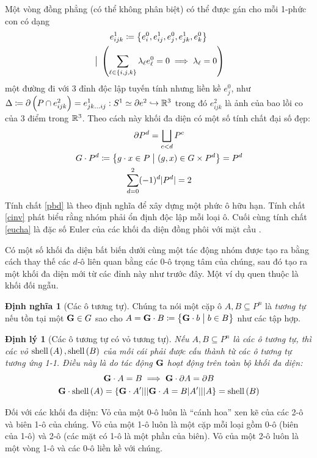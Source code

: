 \documentclass{article}
\theoremstyle{plain}
\newtheorem{theorem}{Định lý}
\theoremstyle{definition}
\newtheorem*{definition}{Định nghĩa}
\begin{document}
Một vòng đồng phẳng (có thể không phân biệt) có thể được gán cho mỗi 1-phức con có dạng
\begin{gather*}
    e^1_{ijk}\coloneqq\left\{e^0_i,e^1_{ij}, e^0_j, e^1_{jk}, e^0_k\right\}\\
    \hspace{1mm}\big|\hspace{1mm} \left(\sum_{\ell\in \left\{i,j,k\right\}}\lambda_\ell e^0_\ell = 0\implies \lambda_\ell = 0\right)
\end{gather*}
một đường đi với 3 đỉnh độc lập tuyến tính nhưng liền kề $e^0_j$, như $\Delta\coloneqq\partial\left(P\cap e^2_{ijk}\right)=e^1_{jk\dots ij}:  S^1\simeq\partial e^2\hookrightarrow \mathbb{R}^3$ trong đó $e^2_{ijk}$ là ảnh của bao lồi co của 3 điểm trong $\mathbb{R}^3$. 
Theo cách này khối đa diện có một số tính chất đại số đẹp: 
\begin{gather}
    \partial P^d = \bigsqcup_{c<d}P^c\label{pbd}\\
    G\cdot P^d\coloneqq\curl{g\cdot x\in P\st (g,x)\in G\times P^d}=P^d\label{cinv}\\
    \sum_{d=0}^2(-1)^d|P^d|=2\label{eucha}
\end{gather}
 Tính chất \ref{pbd} là theo định nghĩa để xây dựng một phức ô hữu hạn.  Tính chất \ref{cinv} phát biểu rằng nhóm phải ổn định độc lập mỗi loại ô. Cuối cùng tính chất \ref{eucha} là đặc số Euler của các khối đa diện đồng phôi với mặt cầu \cite{MR1867354}.

 Có một số khối đa diện bất biến dưới cùng một tác động nhóm được tạo ra bằng cách thay thế các $d$-ô liên quan bằng các 0-ô trọng tâm của chúng, sau đó tạo ra một khối đa diện mới từ các đỉnh này như trước đây. Một ví dụ quen thuộc là khối đối ngẫu. 
 
 \begin{definition}[Các ô tương tự]
    Chúng ta nói một cặp ô $A, B\subseteq P^n$ là \emph{tương tự} nếu tồn tại một $\mathbf{G}\in G$ sao cho $A=\mathbf{G}\cdot B\coloneqq\left\{\mathbf{G}\cdot b\hspace{1mm}\big|\hspace{1mm} b\in B\right\}$ như các tập hợp. 
 \end{definition}
 \begin{theorem}[Các ô tương tự có vỏ tương tự]
     Nếu $A, B\subseteq P^n$ là các ô tương tự, thì các vỏ $\mathrm{shell}\left(A\right), \mathrm{shell}\left(B\right)$ của mỗi cái phải được cấu thành từ các ô tương tự tương ứng 1-1.  Điều này là do tác động $\mathbf{G}$ hoạt động trên toàn bộ khối đa diện: 
     \begin{gather}
         \mathbf{G}\cdot A= B\implies \mathbf{G}\cdot \partial A = \partial B\\
         \mathbf{G}\cdot \mathrm{shell}\left(A\right) = \{\mathbf{G}\cdot A'|||\mathbf{G}\cdot A = B|A'|||A\} = \mathrm{shell}\left(B\right)
     \end{gather}
    
 \end{theorem}
 Đối với các khối đa diện: 
 Vỏ của một 0-ô luôn là ``cánh hoa'' xen kẽ của các 2-ô và biên 1-ô của chúng.  Vỏ của một 1-ô luôn là một cặp mỗi loại gồm 0-ô (biên của 1-ô) và 2-ô (các mặt có 1-ô là một phần của biên). Vỏ của một 2-ô luôn là một vòng 1-ô và các 0-ô liền kề với chúng. 
\end{document}
